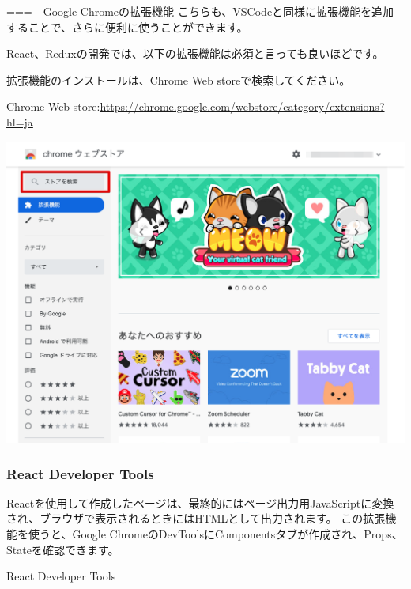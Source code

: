 ===　Google Chromeの拡張機能
こちらも、VSCodeと同様に拡張機能を追加することで、さらに便利に使うことができます。

React、Reduxの開発では、以下の拡張機能は必須と言っても良いほどです。

拡張機能のインストールは、Chrome Web storeで検索してください。

Chrome Web store:\url{https://chrome.google.com/webstore/category/extensions?hl=ja}

\begin{reviewimage}[H]%
\includegraphics[width=1.0\maxwidth]{./images/01-createDevEnv/01_13chromeWebstore.png}%
\label{image:01-createDevEnv:01_13chromeWebstore}
\end{reviewimage}

\subsubsection*{React Developer Tools}
\keeplastskip{
  \label{sec:1-3-1-1}
  \par\nobreak
}

Reactを使用して作成したページは、最終的にはページ出力用JavaScriptに変換され、ブラウザで表示されるときにはHTMLとして出力されます。
この拡張機能を使うと、Google ChromeのDevToolsにComponentsタブが作成され、Props、Stateを確認できます。

React Developer Tools

